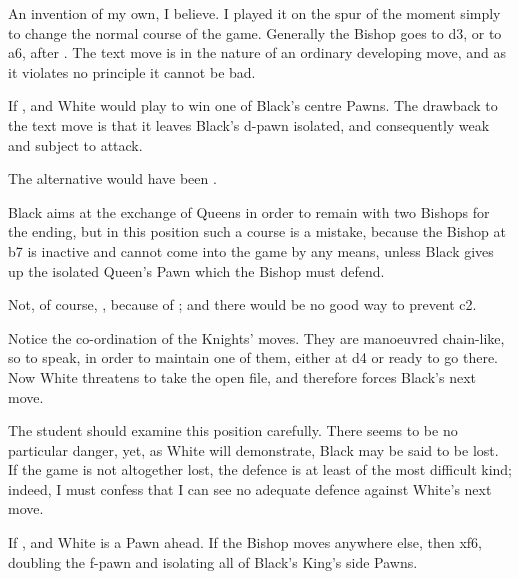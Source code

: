 \documentclass[10pt,twoside]{article}
\begin{document}
An invention of my own, I believe. I played it on the spur of the moment simply to change the normal course of the game. Generally the Bishop goes to d3, or to a6, after . The text move is in the nature of an ordinary developing move, and as it violates no principle it cannot be bad.


If , and White would play to win one of Black's centre Pawns. The drawback to the text move is that it leaves Black's d-pawn isolated, and consequently weak and subject to attack.


The alternative would have been .


Black aims at the exchange of Queens in order to remain with two Bishops for the ending, but in this position such a course is a mistake, because the Bishop at b7 is inactive and cannot come into the game by any means, unless Black gives up the isolated Queen's Pawn which the Bishop must defend.


Not, of course, , because of ; and there would be no good way to prevent \figR c2.


Notice the co-ordination of the Knights' moves. They are manoeuvred chain-like, so to speak, in order to maintain one of them, either at d4 or ready to go there. Now White threatens to take the open file, and therefore forces Black's next move.


\board

The student should examine this position carefully. There seems to be no particular danger, yet, as White will demonstrate, Black may be said to be lost. If the game is not altogether lost, the defence is at least of the most difficult kind; indeed, I must confess that I can see no adequate defence against White's next move.


If , and White is a Pawn ahead. If the Bishop moves anywhere else, then \figB xf6, doubling the f-pawn and isolating all of Black's King's side Pawns.
\end{document}
